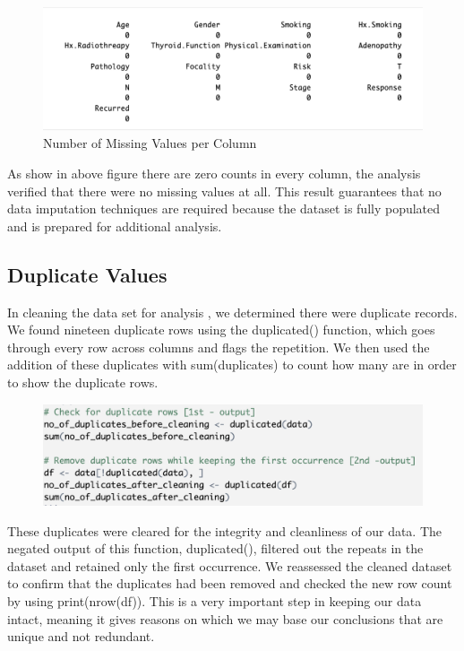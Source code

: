 \documentclass[12pt]{article}
\begin{document}
\begin{figure}[h]
    \centering
    \includegraphics[width=1\textwidth]{Missing.png}  
    \caption{Number of Missing Values per Column}
        \label{fig:example}
   \vspace{0.5cm}
\end{figure}
     
\justifying As show in above figure there are  zero counts in every column, the analysis verified that there were no missing values at all. This result guarantees that no data imputation techniques are required because the dataset is fully populated and is prepared for additional analysis.

\subsection{Duplicate Values}
In cleaning the data set for analysis , we determined there were duplicate records. We found nineteen duplicate rows using the duplicated() function, which goes through every row across columns and flags the repetition. We then used the addition of these duplicates with sum(duplicates) to count how many are in order to show the duplicate rows.

\begin{figure}[h]
    \centering
    \includegraphics[width=1\textwidth]{Duplicate.png}  
        \label{fig:example}
   \vspace{0cm}
\end{figure}

These duplicates were cleared for the integrity and cleanliness of our data. The negated output of this function, duplicated(), filtered out the repeats in the dataset and retained only the first occurrence. We reassessed the cleaned dataset to confirm that the duplicates had been removed and checked the new row count by using print(nrow(df)). This is a very important step in keeping our data intact, meaning it gives reasons on which we may base our conclusions that are unique and not redundant.
\end{document}
